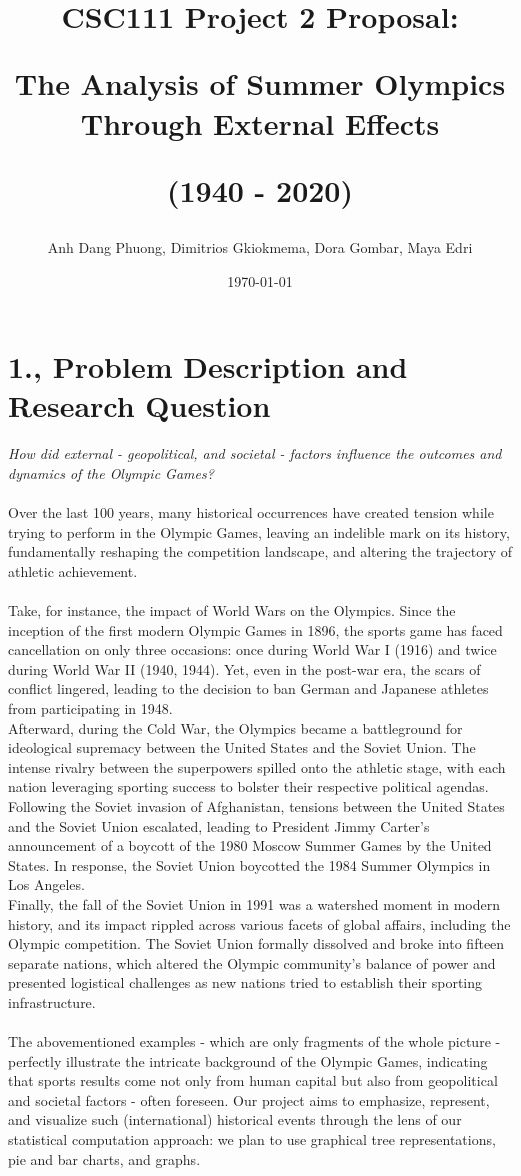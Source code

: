 \documentclass[fontsize=11pt]{article}
\title{CSC111 Project 2 Proposal: 

The Analysis of Summer Olympics Through External Effects 

(1940 - 2020)}
\author{Anh Dang Phuong, Dimitrios Gkiokmema, Dora Gombar, Maya Edri}
\date{\today}
\begin{document}
\maketitle

\section*{1., Problem Description and Research Question}

\textit{How did external - geopolitical, and societal - factors influence the outcomes and dynamics of the Olympic Games?}
\\
\\
Over the last 100 years, many historical occurrences have created tension while trying to perform in the Olympic Games, leaving an indelible mark on its history, fundamentally reshaping the competition landscape, and altering the trajectory of athletic achievement. 
\\
\\
Take, for instance, the impact of World Wars on the Olympics. Since the inception of the first modern Olympic Games in 1896, the sports game has faced cancellation on only three occasions: once during World War I (1916) and twice during World War II (1940, 1944). Yet, even in the post-war era, the scars of conflict lingered, leading to the decision to ban German and Japanese athletes from participating in 1948. 
\\ Afterward, during the Cold War, the Olympics became a battleground for ideological supremacy between the United States and the Soviet Union. The intense rivalry between the superpowers spilled onto the athletic stage, with each nation leveraging sporting success to bolster their respective political agendas. Following the Soviet invasion of Afghanistan, tensions between the United States and the Soviet Union escalated, leading to President Jimmy Carter's announcement of a boycott of the 1980 Moscow Summer Games by the United States. In response, the Soviet Union boycotted the 1984 Summer Olympics in Los Angeles.
\\ Finally, the fall of the Soviet Union in 1991 was a watershed moment in modern history, and its impact rippled across various facets of global affairs, including the Olympic competition. The Soviet Union formally dissolved and broke into fifteen separate nations, which altered the Olympic community's balance of power and presented logistical challenges as new nations tried to establish their sporting infrastructure.
\\
\\
The abovementioned examples - which are only fragments of the whole picture - perfectly illustrate the intricate background of the Olympic Games, indicating that sports results come not only from human capital but also from geopolitical and societal factors - often foreseen. Our project aims to emphasize, represent, and visualize such (international) historical events through the lens of our statistical computation approach: we plan to use graphical tree representations, pie and bar charts, and graphs.
\end{document}
